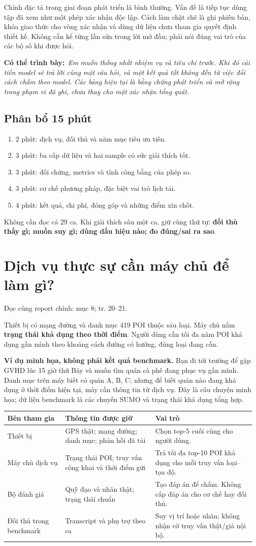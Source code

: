 \documentclass[10pt,a4paper]{article}
\newcommand{\say}[1]{\par\textbf{Có thể trình bày:}\ \textit{#1}\par}
\newcommand{\where}[1]{\par{\small\color{gray}Đọc cùng report chính: #1.}\par}
\newcommand{\example}{\textbf{Ví dụ minh họa, không phải kết quả benchmark.} }
\newcommand{\guidepage}[1]{\clearpage\section{#1}}
\begin{document}
Chỉnh đặc tả trong giai đoạn phát triển là bình thường. Vấn đề là tiếp tục dùng tập đã xem như một phép xác nhận độc lập. Cách làm chặt chẽ là ghi phiên bản, khóa giao thức cho vòng xác nhận và dùng dữ liệu chưa tham gia quyết định thiết kế. Không cần kể từng lần sửa trong lời mở đầu; phải nói đúng vai trò của các bộ số khi được hỏi.

\say{Em muốn thống nhất nhiệm vụ và tiêu chí trước. Khi đó cải tiến model sẽ trả lời cùng một câu hỏi, và một kết quả tốt không đến từ việc đổi cách chấm theo model. Các bảng hiện tại là bằng chứng phát triển và mở rộng trong phạm vi đã ghi, chưa thay cho một xác nhận tổng quát.}

\subsection*{Phân bổ 15 phút}
\begin{enumerate}
\item 2 phút: dịch vụ, đối thủ và năm mục tiêu ưu tiên.
\item 3 phút: ba cấp dữ liệu và hai sample có sức giải thích tốt.
\item 3 phút: đối chứng, metrics và tính công bằng của phép so.
\item 3 phút: cơ chế phương pháp, đặc biệt vai trò lịch tải.
\item 4 phút: kết quả, chi phí, đóng góp và những điểm xin chốt.
\end{enumerate}
Không cần đọc cả 29 ca. Khi giải thích sâu một ca, giữ cùng thứ tự: \textbf{đối thủ thấy gì; muốn suy gì; dùng dấu hiệu nào; đo đúng/sai ra sao}.

\guidepage{Dịch vụ thực sự cần máy chủ để làm gì?}
\where{mục 8; tr. 20--21}
Thiết bị có mạng đường và danh mục 419 POI thuộc sáu loại. Máy chủ nắm \textbf{trạng thái khả dụng theo thời điểm}. Người dùng cần tối đa năm POI khả dụng gần mình theo khoảng cách đường có hướng, đúng loại đang cần.

\example Bạn đi tới trường để gặp GVHD lúc 15 giờ thứ Bảy và muốn tìm quán cà phê đang phục vụ gần mình. Danh mục trên máy biết có quán A, B, C; nhưng để biết quán nào đang khả dụng ở thời điểm hiện tại, máy cần thông tin từ dịch vụ. Đây là câu chuyện minh họa; dữ liệu benchmark là các chuyến SUMO và trạng thái khả dụng tổng hợp.

\begin{longtable}{@{}P{3.5cm}P{6.0cm}P{6.7cm}@{}}
\toprule Bên tham gia & Thông tin được giữ & Vai trò\\\midrule
Thiết bị & GPS thật; mạng đường; danh mục; phản hồi đã tải & Chọn top-5 cuối cùng cho người dùng.\\[3pt]
Máy chủ dịch vụ & Trạng thái POI; truy vấn công khai và thời điểm gửi & Trả tối đa top-10 POI khả dụng cho mỗi truy vấn loại--tọa độ.\\[3pt]
Bộ đánh giá & Quỹ đạo và nhãn thật; trạng thái chuẩn & Tạo đáp án để chấm. Không cấp đáp án cho cơ chế hay đối thủ.\\[3pt]
Đối thủ trong benchmark & Transcript và phụ trợ theo ca & Suy vị trí hoặc nhãn; không nhận cờ truy vấn thật/giả nội bộ.\\
\bottomrule
\end{longtable}
\end{document}
